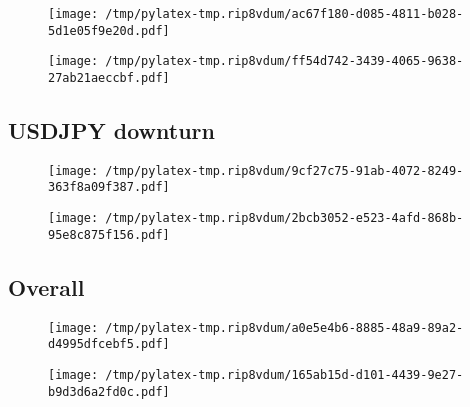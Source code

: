 \documentclass{article}%
\begin{document}
\begin{figure}[htbp]%
\centering%
\texttt{[image: /tmp/pylatex-tmp.rip8vdum/ac67f180-d085-4811-b028-5d1e05f9e20d.pdf]}%
\end{figure}

%


\begin{figure}[htbp]%
\centering%
\texttt{[image: /tmp/pylatex-tmp.rip8vdum/ff54d742-3439-4065-9638-27ab21aeccbf.pdf]}%
\end{figure}

%
\newpage %
\subsection{USDJPY downturn}%
\label{subsec:USDJPYdownturn}%


\begin{figure}[htbp]%
\centering%
\texttt{[image: /tmp/pylatex-tmp.rip8vdum/9cf27c75-91ab-4072-8249-363f8a09f387.pdf]}%
\end{figure}

%


\begin{figure}[htbp]%
\centering%
\texttt{[image: /tmp/pylatex-tmp.rip8vdum/2bcb3052-e523-4afd-868b-95e8c875f156.pdf]}%
\end{figure}

%
\newpage %
\subsection{Overall}%
\label{subsec:Overall}%


\begin{figure}[htbp]%
\centering%
\texttt{[image: /tmp/pylatex-tmp.rip8vdum/a0e5e4b6-8885-48a9-89a2-d4995dfcebf5.pdf]}%
\end{figure}

%


\begin{figure}[htbp]%
\centering%
\texttt{[image: /tmp/pylatex-tmp.rip8vdum/165ab15d-d101-4439-9e27-b9d3d6a2fd0c.pdf]}%
\end{figure}

%
\end{document}
